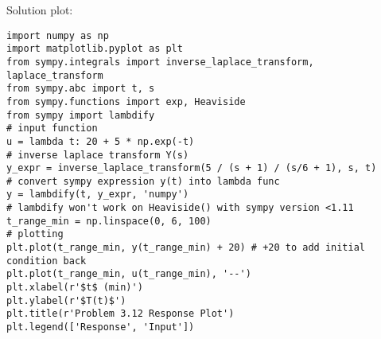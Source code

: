 \documentclass[12pt]{article}
\begin{document}
\begin{enumerate}
    Solution plot:

    

\begin{verbatim}
import numpy as np
import matplotlib.pyplot as plt
from sympy.integrals import inverse_laplace_transform, laplace_transform
from sympy.abc import t, s
from sympy.functions import exp, Heaviside
from sympy import lambdify
# input function
u = lambda t: 20 + 5 * np.exp(-t)
# inverse laplace transform Y(s)
y_expr = inverse_laplace_transform(5 / (s + 1) / (s/6 + 1), s, t)
# convert sympy expression y(t) into lambda func
y = lambdify(t, y_expr, 'numpy')
# lambdify won't work on Heaviside() with sympy version <1.11
t_range_min = np.linspace(0, 6, 100)
# plotting
plt.plot(t_range_min, y(t_range_min) + 20) # +20 to add initial condition back
plt.plot(t_range_min, u(t_range_min), '--')
plt.xlabel(r'$t$ (min)')
plt.ylabel(r'$T(t)$')
plt.title(r'Problem 3.12 Response Plot')
plt.legend(['Response', 'Input'])
\end{verbatim}


\end{enumerate}
\end{document}
